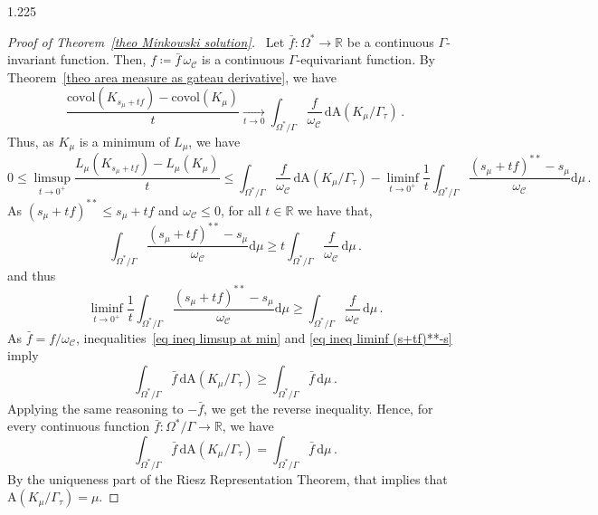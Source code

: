 \documentclass[reqno, a4paper]{amsart}
\numberwithin{equation}{section}
\numberwithin{figure}{section}
\theoremstyle{definition}
\theoremstyle{remark}
\newcommand{\R}{\mathbb{R}} %
\newcommand{\dif}{\mathrm{d}} %
\newcommand{\C}{\mathcal{C}} %
\newcommand{\covol}{\mathrm{covol}} %
\newcommand{\Area}{\mathrm{A}} %
\begin{document}
\begin{spacing}{1.225}
\begin{proof}[Proof of Theorem~\ref{theo Minkowski solution}]
\noindent \textbullet\
Let $\bar{f} : \Omega^* \to \R$ be a continuous $\Gamma$-invariant function. Then, $f\coloneqq \bar{f}\,\omega_\C$ is a continuous $\Gamma$-equivariant function. By Theorem~\ref{theo area measure as gateau derivative}, we have
\begin{equation*} 
\frac{\covol (K_{s_\mu+tf})-\covol(K_\mu)}{t} \xrightarrow[t \to 0]{} \int_{\Omega^*/\Gamma} \frac{f}{\omega_\C} \, \dif \Area(K_\mu/\Gamma_\tau) \, . 
 \end{equation*}
Thus, as $K_\mu$ is a minimum of $L_\mu$, we have 
\begin{equation} 
\label{eq ineq limsup at min}
0 \leq \limsup_{t \to 0^+}\frac{L_\mu (K_{s_\mu+tf})-L_\mu(K_\mu)}{t} \leq \int_{\Omega^*/\Gamma} \frac{f}{\omega_\C} \, \dif \Area(K_\mu/\Gamma_\tau) - \liminf_{t \to 0^+} \frac{1}{t}\int_{\Omega^*/\Gamma} \frac{(s_\mu +tf )^{**}-s_\mu}{\omega_\C} \dif \mu \, . 
\end{equation}
As $(s_\mu +tf )^{**} \leq s_\mu+tf$ and $\omega_\C \leq 0$, for all $t \in \R$ we have that, 
\begin{equation*}
\int_{\Omega^*/\Gamma} \frac{(s_\mu +tf )^{**}-s_\mu}{\omega_\C} \dif \mu \geq t\int_{\Omega^*/\Gamma} \frac{f}{\omega_\C} \, \dif \mu \, . 
 \end{equation*}
and thus
\begin{equation}
\label{eq ineq liminf (s+tf)**-s}
\liminf_{t \to 0^+} \frac{1}{t} \int_{\Omega^*/\Gamma} \frac{(s_\mu +tf )^{**}-s_\mu}{\omega_\C} \dif \mu \geq \int_{\Omega^*/\Gamma} \frac{f}{\omega_\C} \, \dif \mu \, . 
 \end{equation}
As $\bar{f} = f/\omega_\C$, inequalities~\eqref{eq ineq limsup at min} and \eqref{eq ineq liminf (s+tf)**-s} imply
\begin{equation*} 
 \int_{\Omega^*/\Gamma} \bar{f} \, \dif \Area(K_\mu/\Gamma_\tau) \geq \int_{\Omega^*/\Gamma} \bar{f} \, \dif \mu \, . 
\end{equation*}
Applying the same reasoning to $-\bar{f}$, we get the reverse inequality. Hence, for every continuous function $\bar{f} : \Omega^*/\Gamma \to \R$, we have
\begin{equation*} 
 \int_{\Omega^*/\Gamma} \bar{f} \, \dif \Area(K_\mu/\Gamma_\tau) = \int_{\Omega^*/\Gamma} \bar{f} \, \dif \mu \, . 
\end{equation*}
By the uniqueness part of the Riesz Representation Theorem, that implies that $\Area(K_\mu/\Gamma_\tau) = \mu$. 



\end{proof}
\end{spacing}
\end{document}
